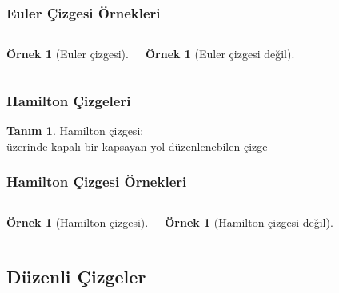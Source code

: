 \documentclass[dvipsnames]{beamer}
\theoremstyle{definition}
\newtheorem{tanim}[theorem]{Tanım}
\theoremstyle{example}
\newtheorem{ornek}[theorem]{Örnek}
\theoremstyle{plain}
\begin{document}
\begin{frame}
  \frametitle{Euler Çizgesi Örnekleri}

  \begin{columns}
    \begin{ornek}[Euler çizgesi]
      \begin{center}
      \end{center}
    \end{ornek}

    \begin{ornek}[Euler çizgesi değil]
      \begin{center}
      \end{center}
    \end{ornek}
  \end{columns}
\end{frame}

\begin{frame}
  \frametitle{Hamilton Çizgeleri}

  \begin{tanim}
    \alert{Hamilton çizgesi}:\\
      üzerinde kapalı bir kapsayan yol düzenlenebilen çizge
  \end{tanim}
\end{frame}

\begin{frame}
  \frametitle{Hamilton Çizgesi Örnekleri}

  \begin{columns}
    \begin{ornek}[Hamilton çizgesi]
      \begin{center}
      \end{center}
    \end{ornek}

    \begin{ornek}[Hamilton çizgesi değil]
      \begin{center}
      \end{center}
    \end{ornek}
  \end{columns}
\end{frame}

\subsection{Düzenli Çizgeler}
\end{document}
